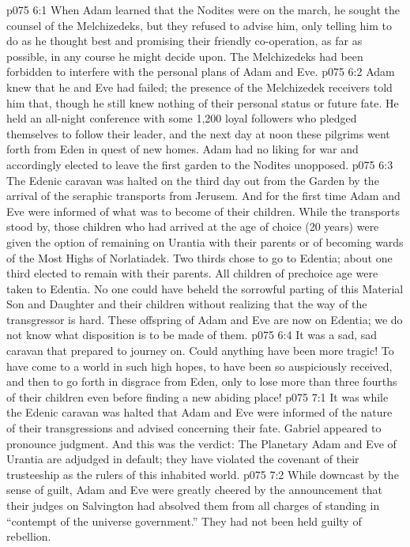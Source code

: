 \vs p075 6:1 When Adam learned that the Nodites were on the march, he sought the counsel of the Melchizedeks, but they refused to advise him, only telling him to do as he thought best and promising their friendly co\hyp{}operation, as far as possible, in any course he might decide upon. The Melchizedeks had been forbidden to interfere with the personal plans of Adam and Eve.
\vs p075 6:2 Adam knew that he and Eve had failed; the presence of the Melchizedek receivers told him that, though he still knew nothing of their personal status or future fate. He held an all\hyp{}night conference with some 1,200 loyal followers who pledged themselves to follow their leader, and the next day at noon these pilgrims went forth from Eden in quest of new homes. Adam had no liking for war and accordingly elected to leave the first garden to the Nodites unopposed.
\vs p075 6:3 The Edenic caravan was halted on the third day out from the Garden by the arrival of the seraphic transports from Jerusem. And for the first time Adam and Eve were informed of what was to become of their children. While the transports stood by, those children who had arrived at the age of choice (20 years) were given the option of remaining on Urantia with their parents or of becoming wards of the Most Highs of Norlatiadek. Two thirds chose to go to Edentia; about one third elected to remain with their parents. All children of prechoice age were taken to Edentia. No one could have beheld the sorrowful parting of this Material Son and Daughter and their children without realizing that the way of the transgressor is hard. These offspring of Adam and Eve are now on Edentia; we do not know what disposition is to be made of them.
\vs p075 6:4 It was a sad, sad caravan that prepared to journey on. Could anything have been more tragic! To have come to a world in such high hopes, to have been so auspiciously received, and then to go forth in disgrace from Eden, only to lose more than three fourths of their children even before finding a new abiding place!
\vs p075 7:1 It was while the Edenic caravan was halted that Adam and Eve were informed of the nature of their transgressions and advised concerning their fate. Gabriel appeared to pronounce judgment. And this was the verdict: The Planetary Adam and Eve of Urantia are adjudged in default; they have violated the covenant of their trusteeship as the rulers of this inhabited world.
\vs p075 7:2 While downcast by the sense of guilt, Adam and Eve were greatly cheered by the announcement that their judges on Salvington had absolved them from all charges of standing in “contempt of the universe government.” They had not been held guilty of rebellion.
